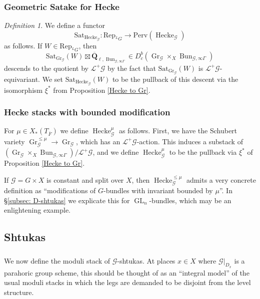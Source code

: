 \documentclass[reqno]{amsart}
\numberwithin{equation}{section}
\newcommand{\Q}{\mathbf{Q}}
\newcommand{\ol}[1]{\overline{#1}}
\newcommand{\Cal}[1]{\mathcal{#1}}
\newcommand{\mrm}[1]{\mathrm{#1}}
\DeclareMathOperator{\GL}{GL}
\DeclareMathOperator{\Bun}{Bun}
\DeclareMathOperator{\Gr}{Gr}
\DeclareMathOperator{\Hecke}{Hecke}
\theoremstyle{remark}
\newtheorem{defn}[thm]{Definition}
\numberwithin{equation}{section}
\begin{document}
\subsubsection{Geometric Satake for Hecke} 

\begin{defn} We define a functor
\[
\mrm{Sat}_{\Hecke_{\Cal{G}}} \colon \mrm{Rep}_{{}^L G}	 \rightarrow \mrm{Perv}( \Hecke_{\Cal{G}} )
\]
as follows. If $W \in \mrm{Rep}_{{}^L G}$, then 
\[
\mrm{Sat}_{\Gr_{\Cal{G}}}(W) \boxtimes \ol{\Q}_{\ell, \Bun_{\Cal{G}, \infty \Gamma}} \in D^b_c(\Gr_{\Cal{G}} \times_{X}  \Bun_{\Cal{G}, \infty \Gamma})
\]
descends to the quotient by $\Cal{L}^+ \Cal{G}$ by the fact that $\mrm{Sat}_{\Gr_{\Cal{G}}}(W)$ is $\Cal{L}^+ \Cal{G}$-equivariant. We set $\mrm{Sat}_{\Hecke_{\Cal{G}}}(W)$ to be  the pullback of this descent via the isomorphism $\xi^*$ from Proposition  \ref{Hecke to Gr}.  
\end{defn}

\subsubsection{Hecke stacks with bounded modification} For $\mu \in X_*(T_{\ol{F}})$ we define $\Hecke_{\Cal{G}}^{\mu}$ as follows. First, we have the Schubert variety $\Gr_{\Cal{G}}^{\leq \mu} \rightarrow \Gr_{\Cal{G}}$, which has an $\Cal{L}^+ \Cal{G}$-action. This induces a substack of $(\Gr_{\Cal{G}} \times_{X} \Bun_{\Cal{G}, \infty \Gamma})/\Cal{L}^+ \Cal{G}$, and we define $\Hecke_{\Cal{G}}^{\mu}$ to be the pullback via $\xi^*$ of Proposition \ref{Hecke to Gr}.

If $\Cal{G}  = G \times X$ is constant and split over $X$, then $\Hecke_{\Cal{G}}^{\leq \mu}$ admits a very concrete definition as ``modifications of $G$-bundles with invariant bounded by $\mu$''. In \S \ref{subsec: D-shtukas} we explicate this for $\GL_n$-bundles, which may be an enlightening example. 


\subsection{Shtukas}

\subsubsection{} We now define the moduli stack of $\Cal{G}$-shtukas. At places $x \in X$ where $\Cal{G}|_{D_x}$ is a parahoric group scheme, this should be thought of as an ``integral model'' of the usual moduli stacks in which the legs are demanded to be disjoint from the level structure.
\end{document}
